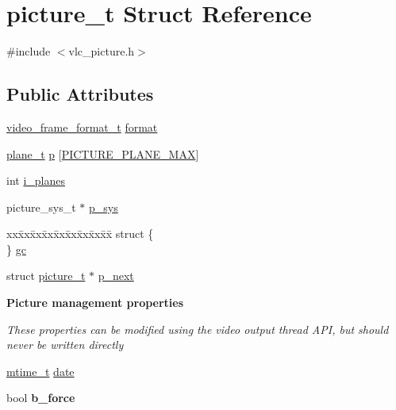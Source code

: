 \hypertarget{structpicture__t}{}\section{picture\+\_\+t Struct Reference}
\label{structpicture__t}


{\ttfamily \#include $<$vlc\+\_\+picture.\+h$>$}

\subsection*{Public Attributes}
\begin{DoxyCompactItemize}
\item 
\hyperlink{structvideo__format__t}{video\+\_\+frame\+\_\+format\+\_\+t} \hyperlink{structpicture__t_a72ac7f1bbca75864dbcd39f4125639de}{format}
\item 
\hyperlink{structplane__t}{plane\+\_\+t} \hyperlink{structpicture__t_af31189ca20dbc6790415f499fb90ecd0}{p} \mbox{[}\hyperlink{vlc__picture_8h_a7c01aa52d32a00e326ed109475556094}{P\+I\+C\+T\+U\+R\+E\+\_\+\+P\+L\+A\+N\+E\+\_\+\+M\+AX}\mbox{]}
\item 
int \hyperlink{structpicture__t_a12306fa911b2406709ae39a3c1cd8564}{i\+\_\+planes}
\item 
picture\+\_\+sys\+\_\+t $\ast$ \hyperlink{structpicture__t_a142c5b32188e3c5f5ba11612ddb92f01}{p\+\_\+sys}
\item 
\begin{tabbing}
xx\=xx\=xx\=xx\=xx\=xx\=xx\=xx\=xx\=\kill
struct \{\\
\} \hyperlink{structpicture__t_a2273f9c1364e15297b25164d27193acf}{gc}\\

\end{tabbing}\item 
struct \hyperlink{structpicture__t}{picture\+\_\+t} $\ast$ \hyperlink{structpicture__t_a24e14541fe992251a5f88a0f2dae9c7d}{p\+\_\+next}
\end{DoxyCompactItemize}
\begin{Indent}\textbf{ Picture management properties}\par
{\em These properties can be modified using the video output thread A\+PI, but should never be written directly }\begin{DoxyCompactItemize}
\item 
\hyperlink{vlc__common_8h_a996e47c5ea061215703c26738351279e}{mtime\+\_\+t} \hyperlink{structpicture__t_a8a6e012c14177a7ddab81f88508da5a4}{date}
\item 
\mbox{\label{structpicture__t_ab75b2558bc630566d49adc71b0561ece}} 
bool {\bfseries b\+\_\+force}
\end{DoxyCompactItemize}
\end{Indent}
